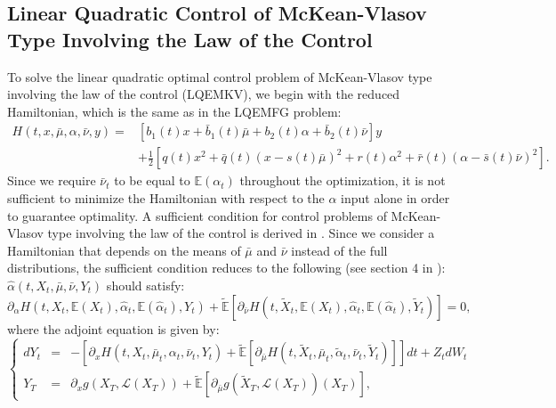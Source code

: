 \documentclass[11pt]{article}
\newcommand\cL{\mathcal L}
\begin{document}
\subsection{\textbf{Linear Quadratic Control of McKean-Vlasov Type Involving the Law of the Control}}\label{sec:EMKV}
To solve the linear quadratic optimal control problem of McKean-Vlasov type involving the law of the control (LQEMKV), we begin with the reduced Hamiltonian, which is the same as in the LQEMFG problem:
\begin{equation*}
\begin{split}
    H(t,x,\bar{\mu},\alpha,\bar{\nu},y)=&\left[b_1(t)x+\bar{b}_1(t)\bar{\mu}+b_2(t) \alpha+\bar{b}_2(t)\bar{\nu}\right]y\\
    &+\frac{1}{2}\left[q(t)x^2+\bar{q}(t)(x-s(t)\bar{\mu})^2 +r(t)\alpha^2+\bar{r}(t)(\alpha-\bar{s}(t)\bar{\nu})^2\right].
\end{split}
\end{equation*}
Since we require $\bar{\nu}_t$ to be equal to $\mathbb{E}(\alpha_t)$ throughout the optimization, it is not sufficient to minimize the Hamiltonian with respect to the $\alpha$ input alone in order to guarantee optimality. A sufficient condition for control problems of McKean-Vlasov type involving the law of the control is derived in \cite{carmona_acciaio}. Since we consider a Hamiltonian that depends on the means of $\bar{\mu}$ and $\bar{\nu}$ instead of the full distributions, the sufficient condition reduces to the following (see section 4 in \cite{carmona_acciaio}):
$\hat{\alpha}(t,X_t,\bar{\mu},\bar{\nu},Y_t)$ should satisfy:
\begin{equation*}
    \partial_{\alpha}H(t,X_t,\mathbb{E}(X_t),\hat{\alpha}_t,\mathbb{E}(\hat{\alpha}_t),Y_t)+\tilde{\mathbb{E}} \left[\partial_{\bar{\nu}}H(t,\tilde{X}_t,\mathbb{E}(X_t),\hat{\alpha}_t,\mathbb{E}(\hat{\alpha}_t),\tilde{Y}_t) \right]=0,
\end{equation*}
where the adjoint equation is given by:
\begin{equation*}
\left\{
\begin{array}{lcl}
    dY_t&=&-\left[\partial_x H(t,X_t,\bar{\mu}_t,\alpha_t,\bar{\nu}_t,Y_t)+\tilde{\mathbb{E}} \left[\partial_{\bar{\mu}}H(t,\tilde{X}_t,\bar{\mu}_t,\tilde{\alpha}_t,\bar{\nu}_t,\tilde{Y}_t) \right] \right]dt+Z_tdW_t \\[8pt]
    Y_T&=&\partial_xg(X_T, \cL(X_T))+\tilde{\mathbb{E}} \left[\partial_{\bar{\mu}}g(\tilde{X}_T,\cL(X_T))(X_T) \right],
\end{array}
\right.
\end{equation*}
\end{document}
